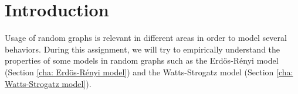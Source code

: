 \chapter{Introduction}
\label{cha: introduction}
 Usage of random graphs is relevant in different areas in order to model several behaviors. During this assignment, we will try to empirically understand the properties of some models in random graphs such as the Erdös-Rényi model (Section \ref{cha: Erdös-Rényi model}) and the Watts-Strogatz model (Section \ref{cha: Watts-Strogatz model}).